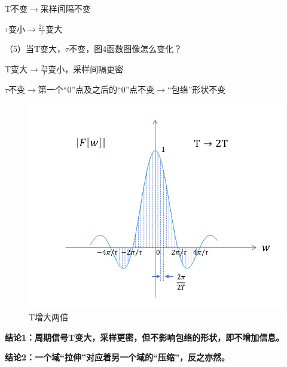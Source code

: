 \documentclass[UTF8]{ctexart}
\begin{document}
T不变$\rightarrow $采样间隔不变\par
$\tau$变小$\rightarrow\frac{2\pi}{\tau}  $变大\par

（5）当T变大，$\tau$不变，图4函数图像怎么变化？\par
T变大$\rightarrow \frac{2\pi}{T}$变小，采样间隔更密\par
$\tau$不变$\rightarrow  $第一个“0”点及之后的“0”点不变$\rightarrow $“包络”形状不变 \par
\begin{figure}[h]
    \centering         %
    \includegraphics[scale=0.5]{6.png}
    \caption{T增大两倍}
\end{figure}

\textbf{ 结论1：周期信号T变大，采样更密，但不影响包络的形状，即不增加信息。} \par
\;\textbf{结论2：一个域“拉伸”对应着另一个域的“压缩”，反之亦然。}\par
\end{document}
